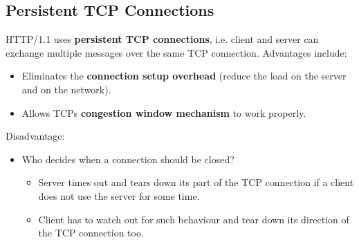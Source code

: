 \documentclass[11pt]{article}
\begin{document}
\subsection{Persistent TCP Connections}
\label{sec:org90cd72e}
HTTP/1.1 uses \textbf{persistent TCP connections}, i.e. client and server can exchange multiple messages over the same TCP connection.
Advantages include:
\begin{itemize}
\item Eliminates the \textbf{connection setup overhead} (reduce the load on the server and on the network).
\item Allows TCPs \textbf{congestion window mechanism} to work properly.
\end{itemize}
Disadvantage:
\begin{itemize}
\item Who decides when a connection should be closed?
\begin{itemize}
\item Server times out and tears down its part of the TCP connection if a client does not use the server for some time.
\item Client has to watch out for such behaviour and tear down its direction of the TCP connection too.
\end{itemize}
\end{itemize}
\end{document}
